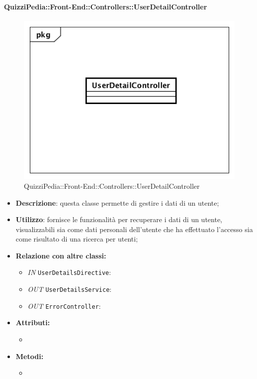 \paragraph{QuizziPedia::Front-End::Controllers::UserDetailController}
\begin{figure}
	\centering
	\includegraphics[scale=0.45]{UML/Classi/Front-End/QuizziPedia_Front-end_Controller_UserDetailController.png}
	\caption{QuizziPedia::Front-End::Controllers::UserDetailController}
\end{figure}
\begin{itemize}
	\item \textbf{Descrizione}: questa classe permette di gestire i dati di un utente;
	\item \textbf{Utilizzo}: fornisce le funzionalità per recuperare i dati di un utente, visualizzabili sia come dati personali dell'utente che ha effettuato l'accesso sia come risultato di una ricerca per utenti;
	\item \textbf{Relazione con altre classi:}
	\begin{itemize}
		\item \textit{IN} \texttt{UserDetailsDirective}: 
		\item \textit{OUT} \texttt{UserDetailsService}:
		\item \textit{OUT} \texttt{ErrorController}: 

	\end{itemize}
	\item \textbf{Attributi:}
	\begin{itemize}
		\item 
	\end{itemize}
	\item \textbf{Metodi:}
	\begin{itemize}
		\item 
	\end{itemize}
\end{itemize}

